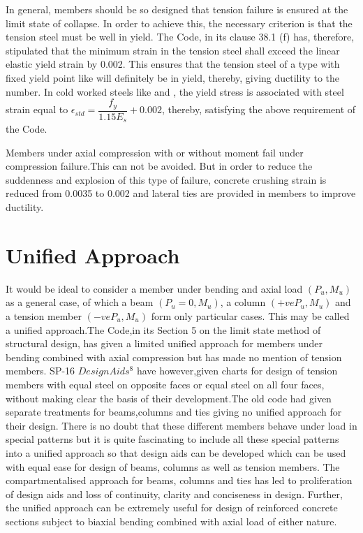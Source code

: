 In general, members should be so designed that tension failure
is ensured at the limit state of collapse. In order to achieve this, the
necessary criterion is that the tension steel must be well in yield. The
Code, in its clause 38.1 (f) has, therefore, stipulated that the minimum
strain in the tension steel shall exceed the linear elastic yield strain
by 0.002. This ensures that the tension steel of a type with fixed yield
point like {\fetwofivezero} will deﬁnitely be in yield, thereby, giving ductility to the number. In cold worked steels like {\fefouronefive} and
{\fefivezerozero}, the yield stress is associated with steel strain equal to              
$\epsilon_{std}=\dfrac{f_y}{1.15 E_s}+0.002$, thereby, satisfying the
above requirement of the Code.

Members under axial compression with or without moment fail under compression failure.This can not be avoided. But in order to reduce the suddenness and explosion of this type of failure, concrete crushing strain is reduced from 0.0035 to 0.002 and lateral ties are provided in members to improve ductility.

\section{Unified Approach}

It would be ideal to consider a member under bending and axial load
$(P_u, M_u)$ as a general case, of which a beam $(P_u=0,M_u)$, a column
$(+ve P_u,M_u)$ and a tension member $(-ve P_u,M_u)$ form only particular
cases. This may be called a uniﬁed approach.The Code,in its Section 5 on
the limit state method of structural design, has given a limited uniﬁed
approach for members under bending combined with axial compression but
has made no mention of tension members. SP-16 $Design Aids^8$ have
however,given charts for design of tension members with equal steel on
opposite faces or equal steel on all four faces, without making clear the
basis of their development.The old code had given separate treatments for
beams,columns and ties giving no unified approach for their design. There
is no doubt that these different members behave under load in special
patterns but it is quite fascinating to include all these special
patterns into a unified approach so that design aids can be developed
which can be used with equal ease for design of beams, columns as well 
as tension members. The compartmentalised approach for beams, columns
and ties has led to proliferation of design aids and loss of continuity,
clarity and conciseness in design. Further, the unified approach can be
extremely useful for design of reinforced concrete sections subject to
biaxial bending combined with axial load of either nature.

